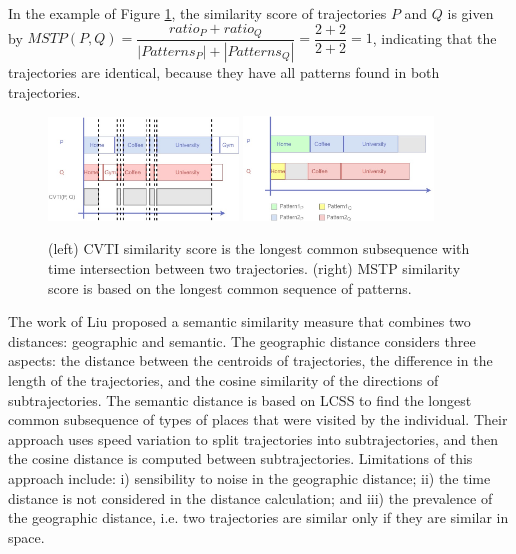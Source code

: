 \documentclass[12pt]{article}
\begin{document}
In the example of Figure \ref{fig:related_trajes_CVTI_MSTP}, the similarity score of trajectories $P$ and $Q$ is given by $MSTP(P, Q) = \dfrac{ratio_P + ratio_Q}{|Patterns_P| + |Patterns_Q|} = \dfrac{2 + 2}{2 + 2} = 1$, indicating that the trajectories are identical, because they have all patterns found in both trajectories.

\begin{figure}[h]
\centering
\includegraphics[width=0.45\textwidth]{Related_Works/Semantic_Trajectories_(CVTI).jpg}
\includegraphics[width=0.45\textwidth]{Related_Works/Semantic_Trajectories_(MSTP).jpg}
\caption{\label{fig:related_trajes_CVTI_MSTP}(left) CVTI similarity score is the longest common subsequence with time intersection between two trajectories. (right) MSTP similarity score is based on the longest common sequence of patterns.}
\end{figure}


The work of Liu\cite{Liu:2012:SMM:2442968.2442971} proposed a semantic similarity measure that combines two distances: geographic and semantic. The geographic distance considers three aspects: the distance between the centroids of trajectories, the difference in the length of the trajectories, and the cosine similarity of the directions of subtrajectories. The semantic distance is based on LCSS to find the longest common subsequence of types of places that were visited by the individual. Their approach uses speed variation to split trajectories into subtrajectories, and then the cosine distance is computed between subtrajectories. Limitations of this approach include: i) sensibility to noise in the geographic distance; ii) the time distance is not considered in the distance calculation; and iii) the prevalence of the geographic distance, i.e. two trajectories are similar only if they are similar in space.
\end{document}
